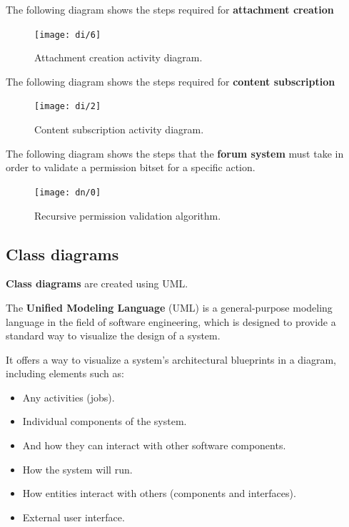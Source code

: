 \documentclass[12pt]{report}
\renewcommand\emph{\textbf}
\begin{document}
                \newpage

                The following diagram shows the steps required for \emph{attachment creation}

                \begin{figure}[H]
                \caption{Attachment creation activity diagram.}
                \centering
                \texttt{[image: di/6]}
                \end{figure}

                \newpage

                The following diagram shows the steps required for \emph{content subscription}

                \begin{figure}[H]
                \caption{Content subscription activity diagram.}
                \centering
                \texttt{[image: di/2]}
                \end{figure}

                \newpage

                The following diagram shows the steps that the \emph{forum system} must take in order to validate a permission bitset for a specific action.

                \begin{figure}[H]
                \caption{Recursive permission validation algorithm.}
                \centering
                \texttt{[image: dn/0]}
                \end{figure}

                \newpage
                \newpage

            \subsection{Class diagrams}

                \emph{Class diagrams} are created using UML.

                The \emph{Unified Modeling Language} (UML) is a general-purpose modeling language in the field of software engineering, which is designed to provide a standard way to visualize the design of a system.
                
                It offers a way to visualize a system's architectural blueprints in a diagram, including elements such as:

                \begin{itemize}
                    \item Any activities (jobs).
                    \item Individual components of the system.
                    \item And how they can interact with other software components.
                    \item How the system will run.
                    \item How entities interact with others (components and interfaces).
                    \item External user interface.
                \end{itemize}
                
\end{document}
